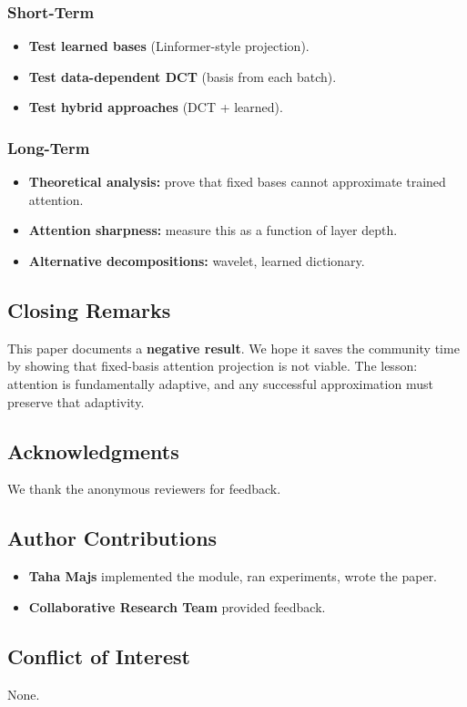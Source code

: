 \subsubsection{Short-Term}

\begin{itemize}
\item \textbf{Test learned bases} (Linformer-style projection).
\item \textbf{Test data-dependent DCT} (basis from each batch).
\item \textbf{Test hybrid approaches} (DCT + learned).

\end{itemize}
\subsubsection{Long-Term}

\begin{itemize}
\item \textbf{Theoretical analysis:} prove that fixed bases cannot approximate
  trained attention.
\item \textbf{Attention sharpness:} measure this as a function of layer depth.
\item \textbf{Alternative decompositions:} wavelet, learned dictionary.

\end{itemize}
\subsection{Closing Remarks}

This paper documents a \textbf{negative result}. We hope it saves the community 
time by showing that fixed-basis attention projection is not viable. The 
lesson: attention is fundamentally adaptive, and any successful 
approximation must preserve that adaptivity.

\subsection{Acknowledgments}

We thank the anonymous reviewers for feedback.

\subsection{Author Contributions}

\begin{itemize}
\item \textbf{Taha Majs} implemented the module, ran experiments, wrote the paper.
\item \textbf{Collaborative Research Team} provided feedback.

\end{itemize}
\subsection{Conflict of Interest}

None.

